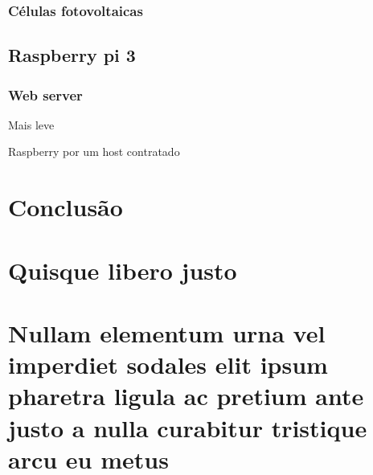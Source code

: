 \documentclass[
	12pt,				%
	openany,			%
	twoside,			%
	a4paper,			%
	english,			%
	french,				%
	spanish,			%
	brazil,				%
	]{abntex2}
\begin{document}
\subsection{Células fotovoltaicas}

\section{Raspberry pi 3}
\subsection{Web server}
Mais leve

Raspberry por um host contratado

\chapter{Conclusão}

\lipsum[31-33]

\postextual



%
%


\begin{apendicesenv}

\partapendices

\chapter{Quisque libero justo}

\lipsum[50]

\chapter{Nullam elementum urna vel imperdiet sodales elit ipsum pharetra ligula
ac pretium ante justo a nulla curabitur tristique arcu eu metus}
\lipsum[55-57]

\end{apendicesenv}
\end{document}
